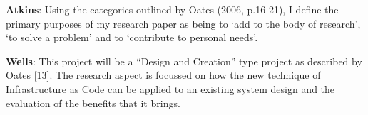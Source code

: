\textbf{Atkins}: Using the categories outlined by Oates (2006, p.16-21), I define the primary purposes of my
research paper as being to ‘add to the body of research’, ‘to solve a problem’ and to
‘contribute to personal needs’.

\textbf{Wells}: This project will be a “Design and Creation” type project as described by Oates [13]. The research
aspect is focussed on how the new technique of Infrastructure as Code can be applied to an existing
system design and the evaluation of the benefits that it brings.